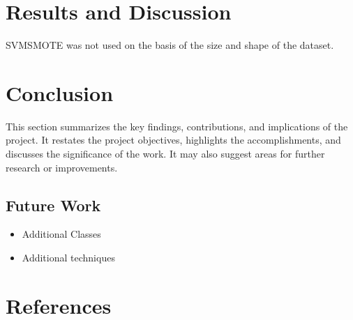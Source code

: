 \documentclass[journal]{IEEEtran}
\begin{document}
	\section{Results and Discussion}
	\label{sec:results_discussion}
	SVMSMOTE was not used on the basis of the size and shape of the dataset.
	
	\section{Conclusion}
	\label{sec:conclusion}
	This section summarizes the key findings, contributions, and implications of the project. It restates the project objectives, highlights the accomplishments, and discusses the significance of the work. It may also suggest areas for further research or improvements.
	
	\subsection{Future Work}
	\begin{itemize}
		\item Additional Classes
		\item Additional techniques
	\end{itemize}
	
	
	\section*{References}
	\label{sec:references}
	
	
\end{document}
